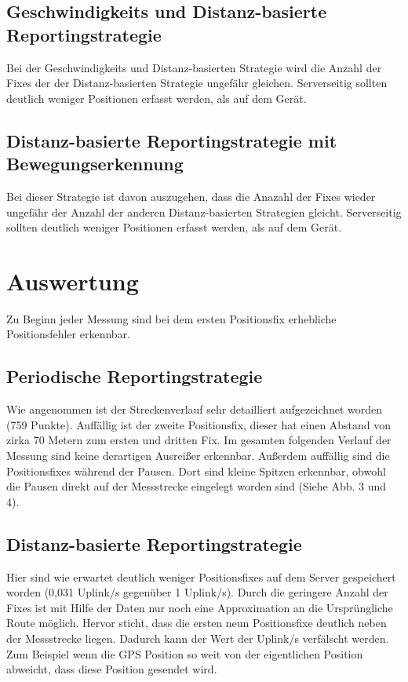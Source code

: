 \subsection{Geschwindigkeits und Distanz-basierte Reportingstrategie}
Bei der Geschwindigkeits und Distanz-basierten Strategie wird die Anzahl der Fixes der der Distanz-basierten Strategie ungefähr gleichen. Serverseitig sollten deutlich weniger Positionen erfasst werden, als auf dem Gerät.

\subsection{Distanz-basierte Reportingstrategie mit Bewegungserkennung}
Bei dieser Strategie ist davon auszugehen, dass die Anazahl der Fixes wieder ungefähr der Anzahl der anderen Distanz-basierten Strategien gleicht. Serverseitig sollten deutlich weniger Positionen erfasst werden, als auf dem Gerät.

\section{Auswertung}
Zu Beginn jeder Messung sind bei dem ersten Positionsfix erhebliche Positionsfehler erkennbar. 

\subsection{Periodische Reportingstrategie}
Wie angenommen ist der Streckenverlauf sehr detailliert aufgezeichnet worden (759 Punkte). Auffällig ist der zweite Positionsfix, dieser hat einen Abstand von zirka 70 Metern zum ersten und dritten Fix. Im gesamten folgenden Verlauf der Messung sind keine derartigen Ausreißer erkennbar. Außerdem auffällig sind die Positionsfixes während der Pausen. Dort sind kleine Spitzen erkennbar, obwohl die Pausen direkt auf der Messstrecke eingelegt worden sind (Siehe Abb. 3 und 4).

\subsection{Distanz-basierte Reportingstrategie}
Hier sind wie erwartet deutlich weniger Positionsfixes auf dem Server gespeichert worden (0,031 Uplink/s gegenüber 1 Uplink/s). Durch die geringere Anzahl der Fixes ist mit Hilfe der Daten nur noch eine Approximation an die Ursprüngliche Route möglich. Hervor sticht, dass die ersten neun Positionsfixe deutlich neben der Messstrecke liegen. Dadurch kann der Wert der Uplink/s verfälscht werden. Zum Beispiel wenn die GPS Position so weit von der eigentlichen Position abweicht, dass diese Position gesendet wird.

